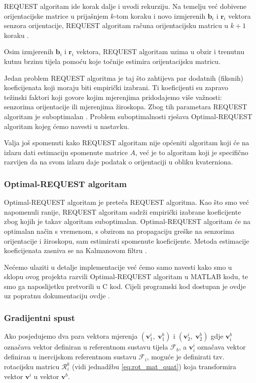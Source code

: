 \documentclass[times, utf8, diplomski, numeric]{templates/template}
\begin{document}
{{{{                REQUEST algoritam ide korak dalje i uvodi rekurziju. Na temelju već dobivene orijentacijske matrice u prijašnjem $k$-tom koraku i novo izmjerenih $\boldsymbol{b}_i$ i $\boldsymbol{r}_i$ vektora senzora orijentacije, REQUEST algoritam računa orijentacijsku matricu u $k+1$ koraku \cite{request_algo}.

                Osim izmjerenih $\boldsymbol{b}_i$ i $\boldsymbol{r}_i$ vektora, REQUEST algoritam uzima u obzir i trenutnu kutnu brzinu tijela pomoću koje točnije estimira orijentacijsku matricu. 

                Jedan problem REQUEST algoritma je taj što zahtijeva par dodatnih (fiksnih) koeficijenata koji moraju biti empirički izabrani. Ti koeficijenti su zapravo težinski faktori koji govore kojim mjerenjima pridodajemo više važnosti: senzorima orijentacije ili mjerenjima žiroskopa. Zbog tih parametara REQUEST algoritam je suboptimalan \cite{opt_req_algo}. Problem suboptimalnosti rješava Optimal-REQUEST algoritam kojeg ćemo navesti u nastavku.

                Valja još spomenuti kako REQUEST algoritam nije općeniti algoritam koji će na izlazu dati estimaciju spomenute matrice $A$, već je to algoritam koji je specifično razvijen da na svom izlazu daje podatak o orijentaciji u obliku kvaterniona.
            }

            \subsubsection{Optimal-REQUEST algoritam}{
                Optimal-REQUEST algoritam je preteča REQUEST algoritma. Kao što smo već napomenuli ranije, REQUEST algoritam sadrži empirički izabrane koeficijente zbog kojih je takav algoritam suboptimalan. Optimal-REQUEST algoritam će na optimalan način s vremenom, s obzirom na propagaciju greške na senzorima orijentacije i žiroskopu, sam estimirati spomenute koeficijente. Metoda estimacije koeficijenata zasniva se na Kalmanovom filtru \cite{opt_req_algo}.

                Nećemo ulaziti u detalje implementacije već ćemo samo navesti kako smo u sklopu ovog projekta razvili Optimal-REQUEST algoritam u MATLAB kodu, te smo ga naposlijetku pretvorili u C kod. Cijeli programski kod dostupan je ovdje \cite{opt_req_kod} uz popratnu dokumentaciju ovdje \cite{opt_req_dokumen}. 
            }

            \subsubsection{Gradijentni spust }{
                Ako posjedujemo dva para vektora mjerenja $(\boldsymbol{v}_1^i, \; \boldsymbol{v}_1^b)$ i $(\boldsymbol{v}_2^i, \; \boldsymbol{v}_2^b)$ gdje $\boldsymbol{v}_i^b$ označava vektor definiran u referentnom sustavu tijela $\mathcal{F}_b$, a $\boldsymbol{v}_i^i$ označava vektor definiran u inercijskom referentnom sustavu $\mathcal{F}_i$, moguće je definirati tzv. rotacijsku matricu $\mathcal{R}_i^b$ (vidi jednadžbu \ref{eq:rot_mat_quat}) koja transformira vektor $\boldsymbol{v}^i $ u vektor $\boldsymbol{v}^b$. 

}}}}
\end{document}
